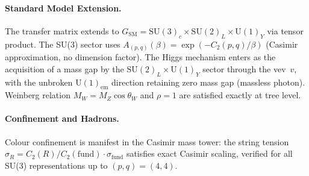 \documentclass[12pt]{article}
\theoremstyle{definition}
\theoremstyle{remark}
\begin{document}
\paragraph{Standard Model Extension.}
The transfer matrix extends to $G_{\mathrm{SM}} = \mathrm{SU}(3)_c \times
\mathrm{SU}(2)_L \times \mathrm{U}(1)_Y$ via tensor product.
The SU(3) sector uses
$A_{(p,q)}(\beta) = \exp(-C_2(p,q)/\beta)$ (Casimir approximation, no
dimension factor).  The Higgs mechanism enters as the acquisition of a
mass gap by the $\mathrm{SU}(2)_L \times \mathrm{U}(1)_Y$ sector through the
vev~$v$, with the unbroken $\mathrm{U}(1)_{\mathrm{em}}$ direction retaining
zero mass gap (massless photon).  Weinberg relation $M_W = M_Z \cos\theta_W$
and $\rho = 1$ are satisfied exactly at tree level.

\paragraph{Confinement and Hadrons.}
Colour confinement is manifest in the Casimir mass tower: the string tension
$\sigma_R = C_2(R)/C_2(\mathrm{fund}) \cdot \sigma_{\mathrm{fund}}$
satisfies exact Casimir scaling, verified for all SU(3) representations up to
$(p,q) = (4,4)$.
\end{document}
